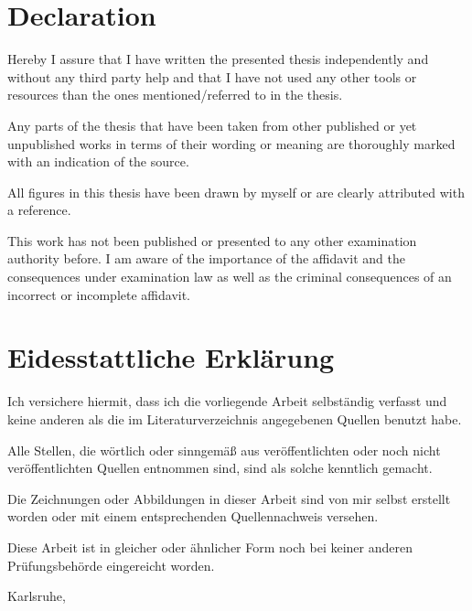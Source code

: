 
\ifdefined\ThesisLanguageIsEnglish
	\chapter*{Declaration}
		\thispagestyle{empty}
		Hereby I assure that I have written the presented thesis independently and without any third party help and that I have not used any other tools or resources than the ones mentioned/referred to in the thesis.
	\medskip

	\noindent
		Any parts of the thesis that have been taken from other published or yet unpublished works in terms of their wording or meaning are thoroughly marked with an indication of the source. 
	\medskip

	\noindent
		All figures in this thesis have been drawn by myself or are clearly attributed with a reference. 
	\medskip

	\noindent
		This work has not been published or presented to any other examination authority before.
		I am aware of the importance of the affidavit and the consequences under examination
		law as well as the criminal consequences of an incorrect or incomplete affidavit.
	\medskip


\else
	\chapter*{Eidesstattliche Erklärung}
		\thispagestyle{empty}
			Ich versichere hiermit, dass ich die vorliegende Arbeit selbständig verfasst und keine anderen als die im Literaturverzeichnis angegebenen Quellen benutzt habe.
		\medskip

		\noindent
			Alle Stellen, die wörtlich oder sinngemäß aus veröffentlichten oder noch nicht veröffentlichten Quellen entnommen sind, sind als solche kenntlich gemacht.
		\medskip

		\noindent
			Die Zeichnungen oder Abbildungen in dieser Arbeit sind von mir selbst erstellt worden oder mit einem entsprechenden Quellennachweis versehen.
		\medskip

		\noindent
			Diese Arbeit ist in gleicher oder ähnlicher Form noch bei keiner anderen Prüfungsbehörde eingereicht worden. 
		\bigskip
\fi

Karlsruhe, \ThesisDeliveryDate

\smallskip

